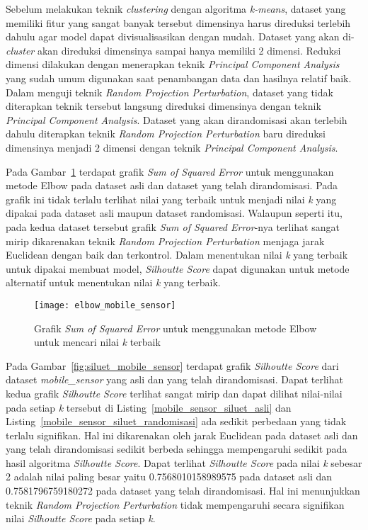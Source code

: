 Sebelum melakukan teknik \textit{clustering} dengan algoritma \textit{k-means}, dataset yang memiliki fitur yang sangat banyak tersebut dimensinya harus direduksi terlebih dahulu agar model dapat divisualisasikan dengan mudah. Dataset yang akan di-\textit{cluster} akan direduksi dimensinya sampai hanya memiliki 2 dimensi. Reduksi dimensi dilakukan dengan menerapkan teknik \textit{Principal Component Analysis} yang sudah umum digunakan saat penambangan data dan hasilnya relatif baik. Dalam menguji teknik \textit{Random Projection Perturbation}, dataset yang tidak diterapkan teknik tersebut langsung direduksi dimensinya dengan teknik \textit{Principal Component Analysis}. Dataset yang akan dirandomisasi akan terlebih dahulu diterapkan teknik \textit{Random Projection Perturbation} baru direduksi dimensinya menjadi 2 dimensi dengan teknik \textit{Principal Component Analysis}.

Pada Gambar~\ref{fig:elbow_mobile_sensor} terdapat grafik \textit{Sum of Squared Error} untuk menggunakan metode Elbow pada dataset asli dan dataset yang telah dirandomisasi. Pada grafik ini tidak terlalu terlihat nilai yang terbaik untuk menjadi nilai \textit{k} yang dipakai pada dataset asli maupun dataset randomisasi. Walaupun seperti itu, pada kedua dataset tersebut grafik \textit{Sum of Squared Error}-nya terlihat sangat mirip dikarenakan teknik \textit{Random Projection Perturbation} menjaga jarak Euclidean dengan baik dan terkontrol. Dalam menentukan nilai \textit{k} yang terbaik untuk dipakai membuat model, \textit{Silhoutte Score} dapat digunakan untuk metode alternatif untuk menentukan nilai \textit{k} yang terbaik.

\begin{figure}
	\centering
	\texttt{[image: elbow\_mobile\_sensor]}
	\caption{Grafik \textit{Sum of Squared Error} untuk menggunakan metode Elbow untuk mencari nilai \textit{k} terbaik}
	\label{fig:elbow_mobile_sensor}
\end{figure}

Pada Gambar~\ref{fig:siluet_mobile_sensor} terdapat grafik \textit{Silhoutte Score} dari dataset \textit{mobile\_sensor} yang asli dan yang telah dirandomisasi. Dapat terlihat kedua grafik \textit{Silhoutte Score} terlihat sangat mirip dan dapat dilihat nilai-nilai pada setiap \textit{k} tersebut di Listing~\ref{mobile_sensor_siluet_asli} dan Listing~\ref{mobile_sensor_siluet_randomisasi} ada sedikit perbedaan yang tidak terlalu signifikan. Hal ini dikarenakan oleh jarak Euclidean pada dataset asli dan yang telah dirandomisasi sedikit berbeda sehingga mempengaruhi sedikit pada hasil algoritma \textit{Silhoutte Score}. Dapat terlihat \textit{Silhoutte Score} pada nilai \textit{k} sebesar 2 adalah nilai paling besar yaitu 0.7568010158989575 pada dataset asli dan 0.7581796759180272 pada dataset yang telah dirandomisasi. Hal ini menunjukkan teknik \textit{Random Projection Perturbation} tidak mempengaruhi secara signifikan nilai \textit{Silhoutte Score} pada setiap \textit{k}.

